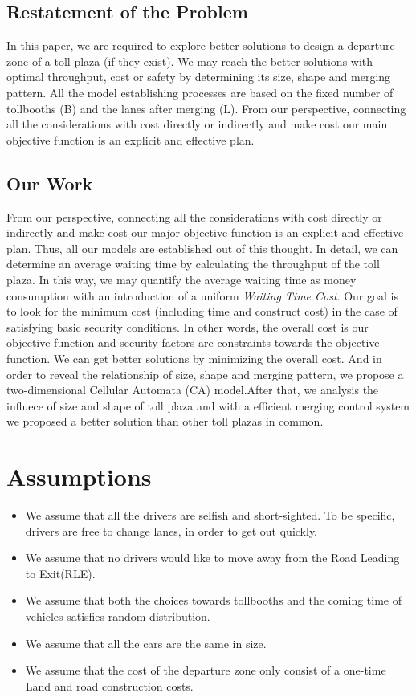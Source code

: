 \documentclass{mcmthesis}
\begin{document}
\subsection{Restatement of the Problem}
In this paper, we are required to explore better
solutions to design a departure zone of a toll plaza (if they exist).
We may reach the better solutions with optimal throughput,
cost or safety by determining its size, shape and merging pattern.
All the model establishing processes are based on the fixed
number of tollbooths (B) and the lanes after merging (L).
From our perspective, connecting all the considerations with cost
directly or indirectly and make cost our main objective function
is an explicit and effective plan.
\subsection{Our Work}
From our perspective, connecting all the considerations
with cost directly or indirectly and make cost our major
objective function is an explicit and effective plan. Thus,
 all our models are established out of this thought.
In detail, we can determine an average waiting time by
calculating the throughput of the toll plaza. In this way,
we may quantify the average waiting time as money consumption
 with an introduction of a uniform \emph {Waiting Time Cost}. Our goal
 is to look for the minimum cost (including time and construct cost)
 in the case of satisfying basic security conditions. In other words,
 the overall cost is our objective function and security factors
are constraints towards the objective function. We can get better
solutions by minimizing the overall cost. And in order to reveal the
 relationship of size, shape and merging pattern,
we propose a two-dimensional Cellular Automata (CA) model.After that,
we analysis the influece of size and shape of toll plaza and with a
efficient merging control system we proposed a better solution than
other toll plazas in common.
\section{Assumptions}
\begin{itemize}
\item We assume that all the drivers are selfish and short-sighted.
 To be specific, drivers are free to
 change lanes, in order to get out quickly.
\item We assume that no drivers would like to move away from the Road
Leading to Exit(RLE).
\item 	We assume that both the choices towards tollbooths and the coming time
of vehicles satisfies random distribution.
\item We assume that all the cars are the same in size.
\item We assume that the cost of the departure zone only consist of a one-time
Land and road construction costs.
\end{itemize}
\end{document}
